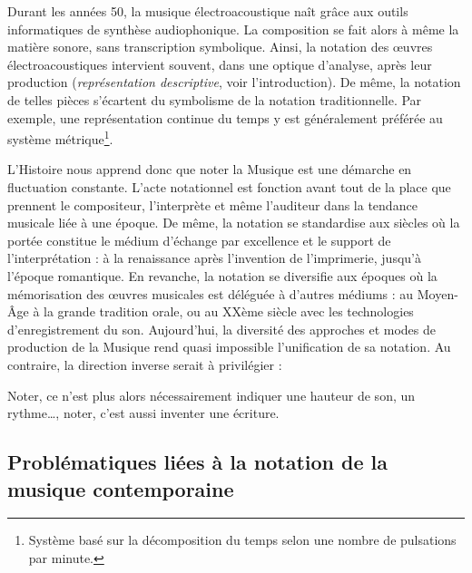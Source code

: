 Durant les années 50, la musique électroacoustique naît grâce aux outils informatiques de synthèse audiophonique. 
La composition se fait alors à même la matière sonore, sans transcription symbolique.
Ainsi, la notation des œuvres électroacoustiques intervient souvent, dans une optique d'analyse, après leur production (\textit{représentation descriptive}, voir l'introduction).
De même, la notation de telles pièces s'écartent du symbolisme de la notation traditionnelle. Par exemple, une représentation continue du temps y est généralement préférée au système métrique\footnote{Système basé sur la décomposition du temps selon une nombre de pulsations par minute.}.

\bigskip

L'Histoire nous apprend donc que noter la Musique est une démarche en fluctuation constante. L'acte notationnel est fonction avant tout de la place que prennent le compositeur, l'interprète et même l'auditeur dans la tendance musicale liée à une époque.
De même, la notation se standardise aux siècles où la portée constitue le médium d'échange par excellence et le support de l'interprétation : à la renaissance après l'invention de l'imprimerie, jusqu'à l'époque romantique.
En revanche, la notation se diversifie aux époques où la mémorisation des œuvres musicales est déléguée à d'autres médiums : au Moyen-Âge à la grande tradition orale, ou au XXème siècle avec les technologies d'enregistrement du son.
Aujourd'hui, la diversité des approches et modes de production de la Musique rend quasi impossible l'unification de sa notation.
Au contraire, la direction inverse serait à privilégier :
\begin{displayquote}
\og Noter, ce n'est plus alors nécessairement indiquer une hauteur de son, un rythme…, noter, c'est aussi inventer une écriture.\fg 
\end{displayquote}

\subsection{Problématiques liées à la notation de la musique contemporaine} 
\label{subsec:pbmatiquesMusiqueContemporaine}


